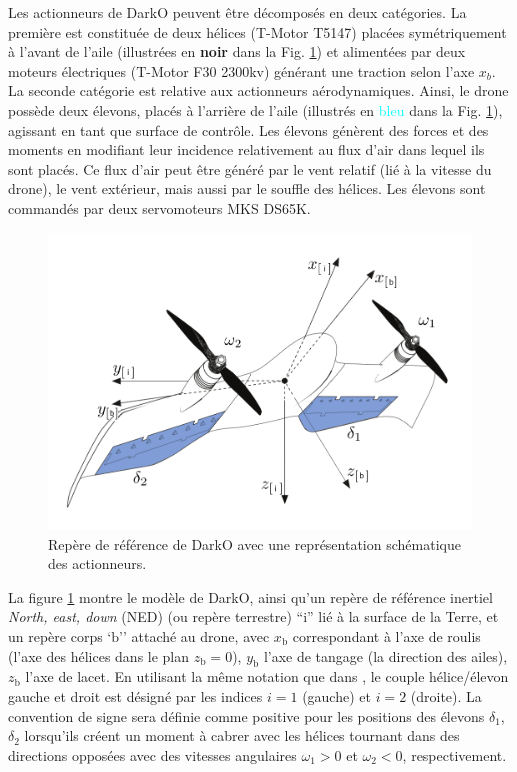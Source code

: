 


Les actionneurs de DarkO peuvent être décomposés en deux catégories. La première est constituée de deux hélices (T-Motor T5147) placées symétriquement à l'avant de l'aile (illustrées en \textbf{noir} dans la Fig. \ref{fig:darko2}) et alimentées par deux moteurs électriques (T-Motor F30 2300kv) générant une traction selon l'axe $x_{b}$. La seconde catégorie est relative aux actionneurs aérodynamiques. Ainsi, le drone possède deux élevons, placés à l'arrière de l'aile (illustrés en \textcolor{cyan}{bleu} dans la Fig. \ref{fig:darko2}), agissant en tant que surface de contrôle. Les élevons génèrent des forces et des moments en modifiant leur incidence relativement au flux d'air dans lequel ils sont placés. Ce flux d'air peut être généré par le vent relatif (lié à la vitesse du drone), le vent extérieur, mais aussi par le souffle des hélices. Les élevons sont commandés par deux servomoteurs MKS DS65K.

\begin{figure}[ht!]
    \centering
    \includegraphics[width=0.8\columnwidth]{figures/darko.png}
    \caption{Repère de référence de DarkO avec une représentation schématique des actionneurs.}
    \label{fig:darko2}
\end{figure}

La figure \ref{fig:darko2} montre le modèle de DarkO, ainsi qu'un repère de référence inertiel \textit{North, east, down} (NED)  (ou repère terrestre) ``$\text{i}$'' lié à la surface de la Terre, et un repère corps `$\text{b}$'' attaché au drone, avec $x_{\text{b}}$ correspondant à l'axe de roulis (l'axe des hélices dans le plan $z_{ \text{b} } = 0$), $y_{\text{b}}$ l'axe de tangage (la direction des ailes), $z_{\text{b}}$ l'axe de lacet. En utilisant la même notation que dans \cite{lustosaHal-03035938}, le couple hélice/élevon gauche et droit est désigné par les indices $i=1$ (gauche) et $i=2$ (droite). La convention de signe sera définie comme positive pour les positions des élevons $\delta_{1}$, $\delta_{2}$ lorsqu'ils créent un moment à cabrer avec les hélices tournant dans des directions opposées avec des vitesses angulaires $\omega_{1} > 0$ et $\omega_{2} < 0$, respectivement.

